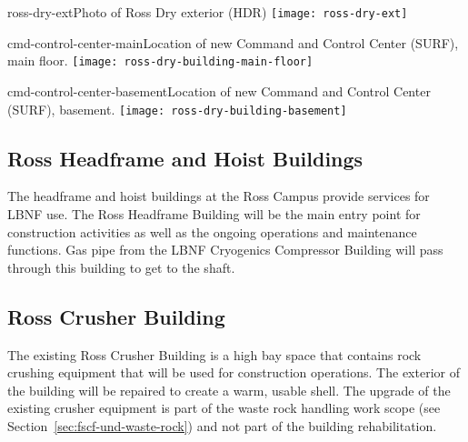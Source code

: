 \begin{cdrfigure}{ross-dry-ext}{Photo of Ross Dry exterior (HDR) }
\texttt{[image: ross-dry-ext]}
\end{cdrfigure}

\begin{cdrfigure}{cmd-control-center-main}{Location of new Command and Control Center (SURF), main floor.}
\texttt{[image: ross-dry-building-main-floor]}
\end{cdrfigure}

\begin{cdrfigure}{cmd-control-center-basement}{Location of new Command and Control Center (SURF), basement.}
\texttt{[image: ross-dry-building-basement]}
\end{cdrfigure}


\subsection{Ross Headframe and Hoist Buildings}
\label{sec:fscf-surf-facil-surface-bldg-rosshead}

The headframe and hoist buildings at the Ross Campus provide services for LBNF use. The Ross Headframe Building will be the main entry point for construction activities as well as the ongoing operations and maintenance functions. Gas pipe from the LBNF Cryogenics Compressor Building will pass through this building to get to the shaft. 

\subsection{Ross Crusher Building}
\label{sec:fscf-surf-facil-surface-bldg-rosscrusher}

The existing Ross Crusher Building is a high bay space that contains rock crushing equipment that will be used for construction operations. The exterior of the building will be repaired to create a warm, usable shell. The upgrade of the existing crusher equipment is part of the waste rock handling work scope (see Section~\ref{sec:fscf-und-waste-rock}) and not part of the building rehabilitation. 

